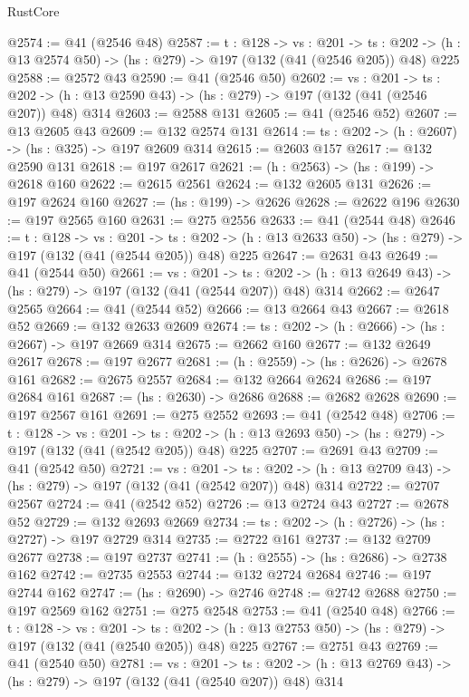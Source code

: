\begin{lexlean}{RustCore}
\begin{coremodule}
@2574 := @41 (@2546 @48)
@2587 := {t : @128} ->
  {vs : @201} ->
  {ts : @202} -> (h : @13 @2574 @50) -> (hs : @279) -> @197 (@132 (@41 (@2546 @205)) @48) @225
@2588 := @2572 @43
@2590 := @41 (@2546 @50)
@2602 := {vs : @201} ->
  {ts : @202} -> (h : @13 @2590 @43) -> (hs : @279) -> @197 (@132 (@41 (@2546 @207)) @48) @314
@2603 := @2588 @131
@2605 := @41 (@2546 @52)
@2607 := @13 @2605 @43
@2609 := @132 @2574 @131
@2614 := {ts : @202} -> (h : @2607) -> (hs : @325) -> @197 @2609 @314
@2615 := @2603 @157
@2617 := @132 @2590 @131
@2618 := @197 @2617
@2621 := (h : @2563) -> (hs : @199) -> @2618 @160
@2622 := @2615 @2561
@2624 := @132 @2605 @131
@2626 := @197 @2624 @160
@2627 := (hs : @199) -> @2626
@2628 := @2622 @196
@2630 := @197 @2565 @160
@2631 := @275 @2556
@2633 := @41 (@2544 @48)
@2646 := {t : @128} ->
  {vs : @201} ->
  {ts : @202} -> (h : @13 @2633 @50) -> (hs : @279) -> @197 (@132 (@41 (@2544 @205)) @48) @225
@2647 := @2631 @43
@2649 := @41 (@2544 @50)
@2661 := {vs : @201} ->
  {ts : @202} -> (h : @13 @2649 @43) -> (hs : @279) -> @197 (@132 (@41 (@2544 @207)) @48) @314
@2662 := @2647 @2565
@2664 := @41 (@2544 @52)
@2666 := @13 @2664 @43
@2667 := @2618 @52
@2669 := @132 @2633 @2609
@2674 := {ts : @202} -> (h : @2666) -> (hs : @2667) -> @197 @2669 @314
@2675 := @2662 @160
@2677 := @132 @2649 @2617
@2678 := @197 @2677
@2681 := (h : @2559) -> (hs : @2626) -> @2678 @161
@2682 := @2675 @2557
@2684 := @132 @2664 @2624
@2686 := @197 @2684 @161
@2687 := (hs : @2630) -> @2686
@2688 := @2682 @2628
@2690 := @197 @2567 @161
@2691 := @275 @2552
@2693 := @41 (@2542 @48)
@2706 := {t : @128} ->
  {vs : @201} ->
  {ts : @202} -> (h : @13 @2693 @50) -> (hs : @279) -> @197 (@132 (@41 (@2542 @205)) @48) @225
@2707 := @2691 @43
@2709 := @41 (@2542 @50)
@2721 := {vs : @201} ->
  {ts : @202} -> (h : @13 @2709 @43) -> (hs : @279) -> @197 (@132 (@41 (@2542 @207)) @48) @314
@2722 := @2707 @2567
@2724 := @41 (@2542 @52)
@2726 := @13 @2724 @43
@2727 := @2678 @52
@2729 := @132 @2693 @2669
@2734 := {ts : @202} -> (h : @2726) -> (hs : @2727) -> @197 @2729 @314
@2735 := @2722 @161
@2737 := @132 @2709 @2677
@2738 := @197 @2737
@2741 := (h : @2555) -> (hs : @2686) -> @2738 @162
@2742 := @2735 @2553
@2744 := @132 @2724 @2684
@2746 := @197 @2744 @162
@2747 := (hs : @2690) -> @2746
@2748 := @2742 @2688
@2750 := @197 @2569 @162
@2751 := @275 @2548
@2753 := @41 (@2540 @48)
@2766 := {t : @128} ->
  {vs : @201} ->
  {ts : @202} -> (h : @13 @2753 @50) -> (hs : @279) -> @197 (@132 (@41 (@2540 @205)) @48) @225
@2767 := @2751 @43
@2769 := @41 (@2540 @50)
@2781 := {vs : @201} ->
  {ts : @202} -> (h : @13 @2769 @43) -> (hs : @279) -> @197 (@132 (@41 (@2540 @207)) @48) @314

\end{coremodule}
\end{lexlean}
